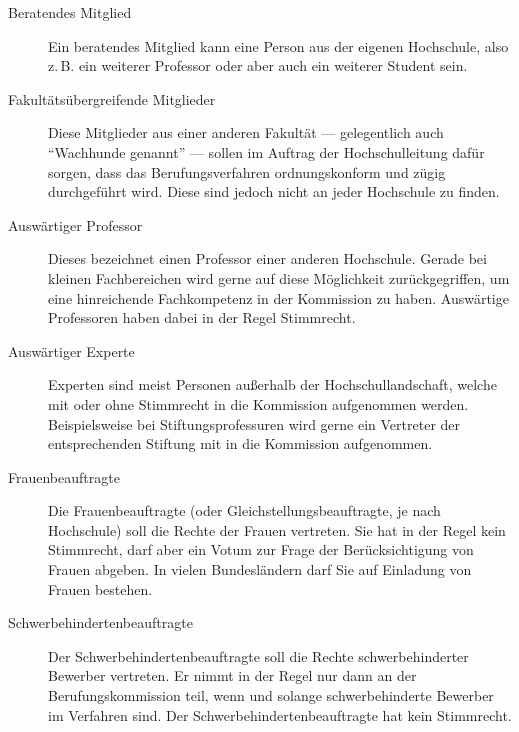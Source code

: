\begin{description}
    \item [Beratendes Mitglied]
          Ein beratendes Mitglied kann eine Person aus der eigenen Hochschule, also z.\,B. ein weiterer Professor oder aber auch ein weiterer Student sein.

    \item [Fakultätsübergreifende Mitglieder]
          Diese Mitglieder aus einer anderen Fakultät --- gele\-gent\-lich auch "`Wachhunde genannt"' --- sollen im Auftrag der Hochschulleitung dafür sorgen, dass das Berufungsverfahren ordnungskonform und zügig durchgeführt wird. Diese sind jedoch nicht an jeder Hochschule zu finden.

    \item [Auswärtiger Professor]
          Dieses bezeichnet einen Professor einer anderen Hochschule. Gerade bei kleinen Fachbereichen wird gerne auf diese Möglichkeit zurückgegriffen, um eine hinreichende Fachkompetenz in der Kommission zu haben. Auswärtige Professoren haben dabei in der Regel Stimmrecht.

    \item [Auswärtiger Experte]
          Experten sind meist Personen außerhalb der Hochschullandschaft, welche mit oder ohne Stimmrecht in die Kommission aufgenommen werden. Beispielsweise bei Stiftungsprofessuren wird gerne ein Vertreter der entsprechenden Stiftung mit in die Kommission aufgenommen.

    \item [Frauenbeauftragte]
          Die Frauenbeauftragte (oder Gleichstellungsbeauftragte, je nach Hochschule) soll die Rechte der Frauen vertreten. Sie hat in der Regel kein Stimmrecht, darf aber ein Votum zur Frage der Berücksichtigung von
          Frauen abgeben. In vielen Bundesländern darf Sie auf Einladung von Frauen bestehen.

    \item [Schwerbehindertenbeauftragte]
          Der Schwerbehindertenbeauftragte soll die Rechte schwerbehinderter Bewerber vertreten. Er nimmt in der
          Regel nur dann an der Berufungskommission teil, wenn und solange schwerbehinderte Bewerber im Verfahren
          sind. Der Schwerbehindertenbeauftragte hat kein Stimmrecht.

\end{description}


